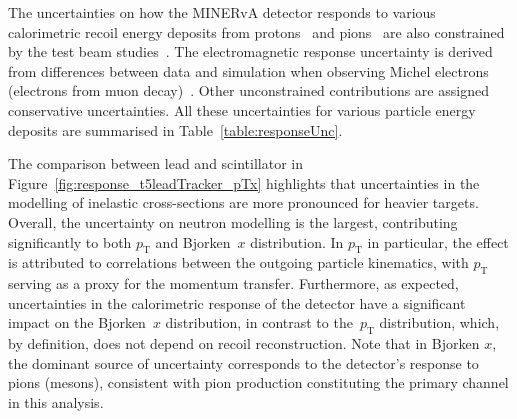 
The uncertainties on how the MINERvA detector responds to various calorimetric recoil energy deposits from protons~\cite{protonTestbeam} and pions~\cite{pionTestbeam} are also constrained by the test beam studies~\cite{ALIAGA201528}. The electromagnetic response uncertainty is derived from differences between data and simulation when observing Michel electrons (electrons from muon decay)~\cite{Aliaga_2014}. Other unconstrained contributions are assigned conservative uncertainties. All these uncertainties for various particle energy deposits are summarised in Table~\ref{table:responseUnc}.

The comparison between lead and scintillator in Figure~\ref{fig:response_t5leadTracker_pTx} highlights that uncertainties in the modelling of inelastic cross-sections are more pronounced for heavier targets. Overall, the uncertainty on neutron modelling is the largest, contributing significantly to both $p_{\text{T}}$ and Bjorken~$x$ distribution. In $p_{\text{T}}$ in particular, the effect is attributed to correlations between the outgoing particle kinematics, with $p_{\text{T}}$ serving as a proxy for the momentum transfer. Furthermore, as expected, uncertainties in the calorimetric response of the detector have a significant impact on the Bjorken~$x$ distribution, in contrast to the~$p_{\text{T}}$ distribution, which, by definition, does not depend on recoil reconstruction. Note that in Bjorken $x$, the dominant source of uncertainty corresponds to the detector's response to pions (mesons), consistent with pion production constituting the primary channel in this analysis. \enlargethispage{1.\baselineskip} 

